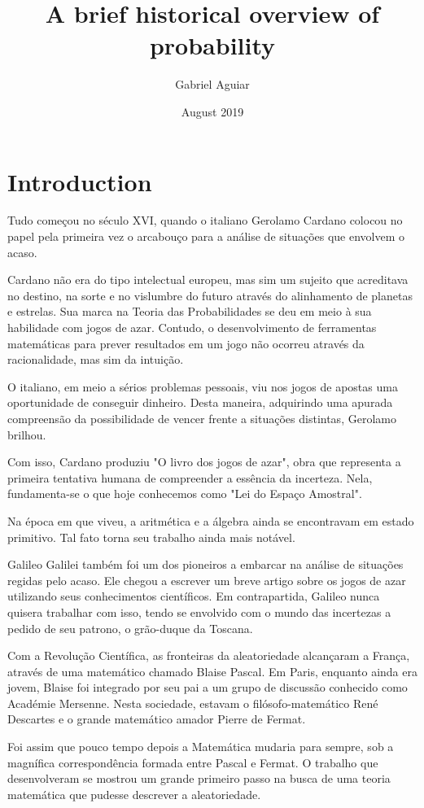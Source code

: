 \documentclass{article}
\title{A brief historical overview of probability}
\author{Gabriel Aguiar}
\date{August 2019}
\begin{document}
\maketitle

\section{Introduction}

\hfill

Tudo começou no século XVI, quando o italiano Gerolamo Cardano colocou no papel pela primeira vez o arcabouço para a análise de situações que envolvem o acaso.

Cardano não era do tipo intelectual europeu, mas sim um sujeito que acreditava no destino, na sorte e no vislumbre do futuro através do alinhamento de planetas e estrelas. Sua marca na Teoria das Probabilidades se deu em meio à sua habilidade com jogos de azar. Contudo, o desenvolvimento de ferramentas matemáticas para prever resultados em um jogo não ocorreu através da racionalidade, mas sim da intuição.

O italiano, em meio a sérios problemas pessoais, viu nos jogos de apostas uma oportunidade de conseguir dinheiro. Desta maneira, adquirindo uma apurada compreensão da possibilidade de vencer frente a situações distintas, Gerolamo brilhou.

Com isso, Cardano produziu "O livro dos jogos de azar", obra que representa a primeira tentativa humana de compreender a essência da incerteza. Nela, fundamenta-se o que hoje conhecemos como "Lei do Espaço Amostral".

Na época em que viveu, a aritmética e a álgebra ainda se encontravam em estado primitivo. Tal fato torna seu trabalho ainda mais notável.

Galileo Galilei também foi um dos pioneiros a embarcar na análise de situações regidas pelo acaso. Ele chegou a escrever um breve artigo sobre os jogos de azar utilizando seus conhecimentos científicos. Em contrapartida, Galileo nunca quisera trabalhar com isso, tendo se envolvido com o mundo das incertezas a pedido de seu patrono, o grão-duque da Toscana.

Com a Revolução Científica, as fronteiras da aleatoriedade alcançaram a França, através de uma matemático chamado Blaise Pascal. Em Paris, enquanto ainda era jovem, Blaise foi integrado por seu pai a um grupo de discussão conhecido como Académie Mersenne. Nesta sociedade, estavam o filósofo-matemático René Descartes e o grande matemático amador Pierre de Fermat.

Foi assim que pouco tempo depois a Matemática mudaria para sempre, sob a magnífica correspondência formada entre Pascal e Fermat. O trabalho que desenvolveram se mostrou um grande primeiro passo na busca de uma teoria matemática que pudesse descrever a aleatoriedade. 
\end{document}
